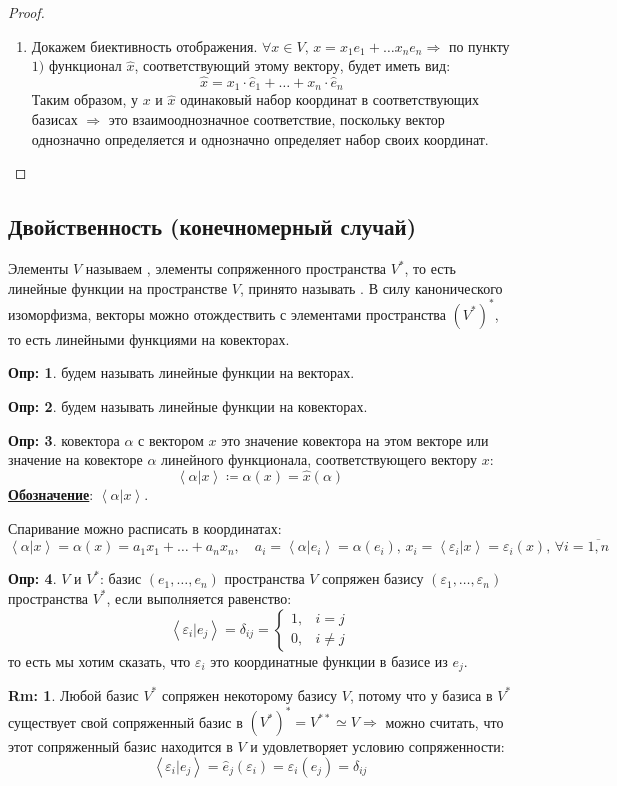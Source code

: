 \documentclass[12pt]{article}
\newcommand{\VE}{\varepsilon}
\theoremstyle{definition}
\newtheorem{defn}{Опр:}
\newtheorem{rem}{Rm:}
\newcommand{\linmer}[2]{\left\langle #1 \vert #2\right\rangle }
\newcommand{\wht}[1]{\widehat{#1}}
\begin{document}
\begin{proof}
\begin{enumerate}[label=\arabic*)]
		\item Докажем биективность отображения. $\forall x \in V, \, x = x_1 e_1 + \dotsc x_n e_n \Rightarrow$ по пункту $1)$ функционал $\wht{x}$, соответствующий этому вектору, будет иметь вид:
		$$
			\wht{x} = x_1{\cdot}\wht{e}_1 + \dotsc + x_n{\cdot}\wht{e}_n
		$$
		Таким образом, у $x$ и $\wht{x}$ одинаковый набор координат в соответствующих базисах $\Rightarrow$ это взаимооднозначное соответствие, поскольку вектор однозначно определяется и однозначно определяет набор своих координат.
	\end{enumerate}
\end{proof}

\subsection*{Двойственность (конечномерный случай)}
Элементы $V$ называем , элементы сопряженного пространства $V^*$, то есть линейные функции на пространстве $V$, принято называть . В силу канонического изоморфизма, векторы можно отождествить с элементами пространства $(V^*)^*$, то есть линейными функциями на ковекторах.
\begin{defn}
	 будем называть линейные функции на векторах.
\end{defn}
\begin{defn}
	 будем называть линейные функции на ковекторах.
\end{defn}

\begin{defn}
	 ковектора $\alpha$ с вектором $x$ это значение ковектора на этом векторе или значение на ковекторе $\alpha$ линейного функционала, соответствующего вектору $x$:
	$$
		\linmer{\alpha}{x} \coloneqq \alpha(x) = \wht{x}(\alpha)
	$$
	\textbf{\uline{Обозначение}}: $\linmer{\alpha}{x}$.
\end{defn}
Спаривание можно расписать в координатах:
$$
	\linmer{\alpha}{x} = \alpha(x) = a_1 x_1 + \dotsc + a_n x_n, \quad a_i = \linmer{\alpha}{e_i} = \alpha(e_i), \, x_i = \linmer{\VE_i}{x} = \VE_i(x), \, \forall i = \overline{1,n}
$$
\begin{defn}
	 $V$ и $V^*$: базис $(e_1,\dotsc, e_n)$ пространства $V$ сопряжен базису $(\VE_1, \dotsc, \VE_n)$ пространства $V^*$, если выполняется равенство:
	$$
		\linmer{\VE_i}{e_j} = \delta_{ij} = \left\{
		\begin{array}{rl}
			1, & i = j\\
			0, & i \neq j
		\end{array}
		\right.
	$$
	то есть мы хотим сказать, что $\VE_i$ это координатные функции в базисе из $e_j$.
\end{defn}
\begin{rem}
	Любой базис $V^*$ сопряжен некоторому базису $V$, потому что у базиса в $V^*$ существует свой сопряженный базис в $(V^*)^* = V^{**} \simeq V \Rightarrow$ можно считать, что этот сопряженный базис находится в $V$ и удовлетворяет условию сопряженности:
	$$
		\linmer{\VE_i}{e_j} = \wht{e}_j(\VE_i) = \VE_i(e_j) = \delta_{ij}
	$$
\end{rem}
\end{document}
